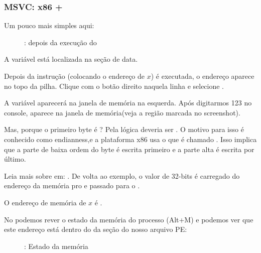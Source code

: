 \clearpage
\subsubsection{MSVC: x86 + \olly}
\myindex{\olly}

Um pouco mais simples aqui:

\begin{figure}[H]
\centering
{}
\caption{\olly: depois da execução do \scanf}
\label{fig:scanf_ex2_olly_1}
\end{figure}

A variável está localizada na seção de data.

Depois da instrução \PUSH (colocando o endereço de $x$) é executada, o endereço aparece no topo da pilha. Clique com o botão direito naquela linha e selecione .

A variável aparecerá na janela de memória na esquerda.
Após digitarmos 123 no console,   aparece na janela de memória(veja a região marcada no screenshot).

Mas, porque o primeiro byte é ?
Pela lógica deveria ser .
O motivo para isso é conhecido como \gls{endianness},e a plataforma x86 usa o que é chamado .
Isso implica que a parte de baixa ordem do byte é escrita primeiro e a parte alta é escrita por último.

Leia mais sobre em: .
De volta ao exemplo, o valor de 32-bits é carregado do endereço da memória pro \EAX e passado para o \printf.

O endereço de memória de $x$ é .

\clearpage
No \olly podemos rever o estado da memória do processo (Alt+M) e podemos ver que este endereço está dentro do da seção  do nosso arquivo PE:

\label{olly_memory_map_example}
\begin{figure}[H]
\centering
{}
\caption{\olly: Estado da memória}
\label{fig:scanf_ex2_olly_2}
\end{figure}

